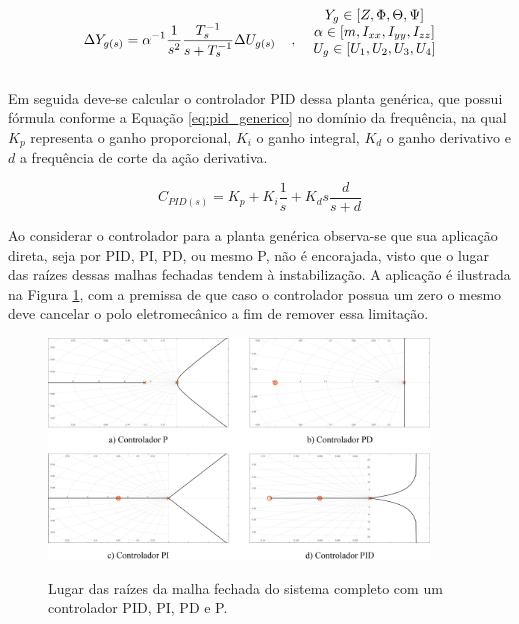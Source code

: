 \documentclass[main.tex]{subfiles}
\begin{document}
\begin{equation}\label{eq:planta_generica_simplificada}
	\Delta Y_{g(s)} = \alpha^{-1}\frac{1}{s^2}\frac{T_s^{-1}}{s + T_s^{-1}}\Delta U_{g(s)}\hspace{0.4cm},\hspace{0.4cm} \begin{matrix}
		Y_g \in [Z, \Phi, \Theta, \Psi]\\
		\alpha \in [m, I_{xx}, I_{yy}, I_{zz}]\\\vspace{0.2cm}
		U_g \in [U_1, U_2, U_3, U_4]\vspace{0.2cm}
	\end{matrix}
\end{equation}

Em seguida deve-se calcular o controlador PID dessa planta genérica, que possui fórmula conforme a Equação \ref{eq:pid_generico} no domínio da frequência, na qual $K_p$ representa o ganho proporcional, $K_i$ o ganho integral, $K_d$ o ganho derivativo e $d$ a frequência de corte da ação derivativa.

\begin{equation}\label{eq:pid_generico}
	C_{PID(s)} = K_p + K_i\frac{1}{s} + K_ds\frac{d}{s + d}
\end{equation}

Ao considerar o controlador para a planta genérica observa-se que sua aplicação direta, seja por PID, PI, PD, ou mesmo P, não é encorajada, visto que o lugar das raízes dessas malhas fechadas tendem à instabilização. A aplicação é ilustrada na Figura \ref{fig:lugar_raizes_ruim}, com a premissa de que caso o controlador possua um zero o mesmo deve cancelar o polo eletromecânico a fim de remover essa limitação.

\begin{figure}[!h]
	\centering
	\caption{Lugar das raízes da malha fechada do sistema completo com um controlador PID, PI, PD e P.}
	\includegraphics[width=0.9\textwidth]{capitulos/controle_atitude/imgs/lugar_raizes_ruim.png}
	\label{fig:lugar_raizes_ruim}
\end{figure}
\end{document}
